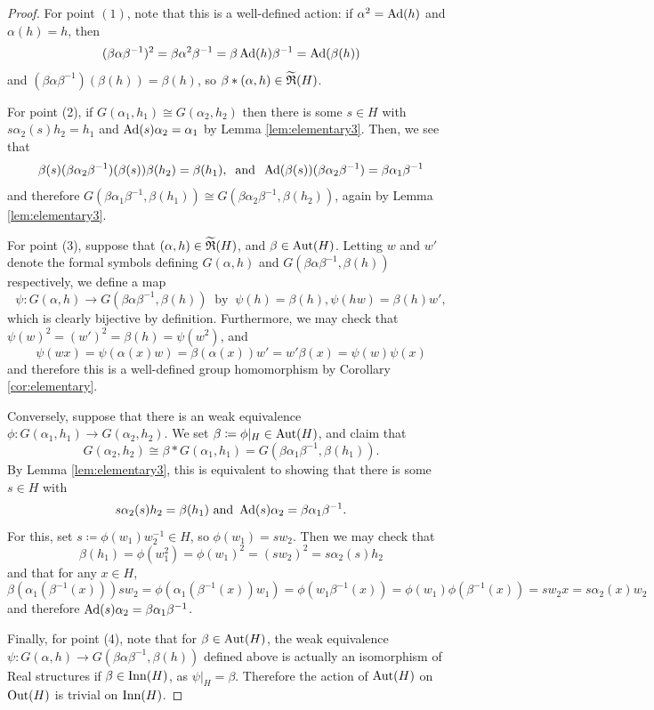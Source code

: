 \begin{proof}
  For point $(1)$, note that this is a well-defined action: if $\alpha^2 = \operatorname{Ad}(h)$ and $\alpha(h) = h$, then
  \[
  (\beta  \alpha  \beta^{-1})^2 = \beta  \alpha^2  \beta^{-1} = \beta  \operatorname{Ad}(h)  \beta^{-1} = \operatorname{Ad}(\beta(h))
  \]
  and $(\beta  \alpha  \beta^{-1})(\beta(h)) = \beta(h)$, so $\beta * (\alpha, h) \in \widetilde{{\mathfrak R}}(H)$.
  
  For point (2), if $G(\alpha_1, h_1) \cong G(\alpha_2, h_2)$ then there is some $s \in H$ with $s \alpha_2(s) h_2 = h_1$ and $\operatorname{Ad}(s) \alpha_2 = \alpha_1$ by Lemma \ref{lem:elementary3}. Then, we see that 
  \[
  \beta(s) (\beta \alpha_2 \beta^{-1})(\beta(s)) \beta(h_2) = \beta(h_1), \: \text{ and } \: \operatorname{Ad}(\beta(s)) (\beta\alpha_2\beta^{-1}) = \beta\alpha_1\beta^{-1}
  \]
  and therefore $G(\beta  \alpha_1  \beta^{-1} , \beta(h_1)) \cong G(\beta  \alpha_2  \beta^{-1}, \beta(h_2))$, again by Lemma \ref{lem:elementary3}.

  For point (3), suppose that $(\alpha, h) \in \widetilde{{\mathfrak R}}(H)$, and $\beta \in \operatorname{Aut}(H)$. Letting $w$ and $w'$ denote the formal symbols defining $G(\alpha,h)$ and $G(\beta \alpha \beta^{-1}, \beta(h))$ respectively, we define a map
  \[
  \psi \colon G(\alpha,h) \rightarrow G(\beta \alpha \beta^{-1}, \beta(h)) \: \text{ by } \: \psi(h) = \beta(h), \psi(hw) = \beta(h) w',
  \]
  which is clearly bijective by definition. Furthermore, we may check that $\psi(w)^2 = (w')^2 = \beta(h) = \psi(w^2)$, and
  \[
  \psi(wx) = \psi(\alpha(x) w) = \beta(\alpha(x))w' = w' \beta(x) = \psi(w) \psi(x)
  \]
  and therefore this is a well-defined group homomorphism by Corollary \ref{cor:elementary}.

  Conversely, suppose that there is an weak equivalence $\phi \colon G(\alpha_1,h_1) \rightarrow G(\alpha_2, h_2)$. We set $\beta \coloneqq \phi|_{H} \in \operatorname{Aut}(H)$, and claim that
  \[
  G(\alpha_2, h_2) \cong \beta * G(\alpha_1,h_1) = G(\beta \alpha_1 \beta^{-1},\beta(h_1)).
  \]
  By Lemma \ref{lem:elementary3}, this is equivalent to showing that there is some $s \in H$ with
  \[
    s \alpha_2(s) h_2 = \beta(h_1) \text{ and } \operatorname{Ad}(s) \alpha_2 = \beta \alpha_1 \beta^{-1}. 
  \]
  For this, set $s \coloneqq \phi(w_1)w_2^{-1} \in H$, so $\phi(w_1) = s w_2$. Then we may check that
  \[
    \beta(h_1) = \phi(w_1^2) = \phi(w_1)^2 = (s w_2)^2 = s \alpha_2(s)h_2
  \] 
  and that for any $x \in H$,
  \[
  \beta(\alpha_1(\beta^{-1}(x))) s w_2 = \phi(\alpha_1(\beta^{-1}(x)) w_1) = \phi(w_1 \beta^{-1}(x)) = \phi(w_1)\phi(\beta^{-1}(x)) = s w_2 x = s \alpha_2(x) w_2
  \]
  and therefore $\operatorname{Ad}(s) \alpha_2 = \beta \alpha_1 \beta^{-1}$.

  Finally, for point (4), note that for $\beta \in \operatorname{Aut}(H)$, the weak equivalence $\psi \colon G(\alpha,h) \rightarrow G(\beta \alpha \beta^{-1}, \beta(h))$ defined above is actually an isomorphism of Real structures if $\beta \in \operatorname{Inn}(H)$, as $\psi|_H = \beta$. Therefore the action of $\operatorname{Aut}(H)$ on $\operatorname{Out}(H)$ is trivial on $\operatorname{Inn}(H)$.
\end{proof}

